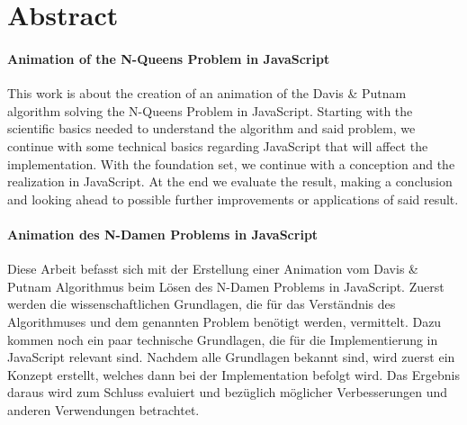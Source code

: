 
\chapter*{Abstract}
\subsubsection{Animation of the N-Queens Problem in JavaScript}
This work is about the creation of an animation of the Davis \& Putnam algorithm solving the N-Queens Problem in JavaScript. Starting with the scientific basics needed to understand the algorithm and said problem, we continue with some technical basics regarding JavaScript that will affect the implementation. With the foundation set, we continue with a conception and the realization in JavaScript. At the end we evaluate the result, making a conclusion and looking ahead to possible further improvements or applications of said result.

\subsubsection{Animation des  N-Damen Problems in JavaScript}
Diese Arbeit befasst sich mit der Erstellung einer Animation vom Davis \& Putnam Algorithmus beim Lösen des N-Damen Problems in JavaScript. Zuerst werden die wissenschaftlichen Grundlagen, die für das Verständnis des Algorithmuses und dem genannten Problem benötigt werden, vermittelt. Dazu kommen noch ein paar technische Grundlagen, die für die Implementierung in JavaScript relevant sind. Nachdem alle Grundlagen bekannt sind, wird zuerst ein Konzept erstellt, welches dann bei der Implementation befolgt wird. Das Ergebnis daraus wird zum Schluss evaluiert und bezüglich möglicher Verbesserungen und anderen Verwendungen betrachtet.